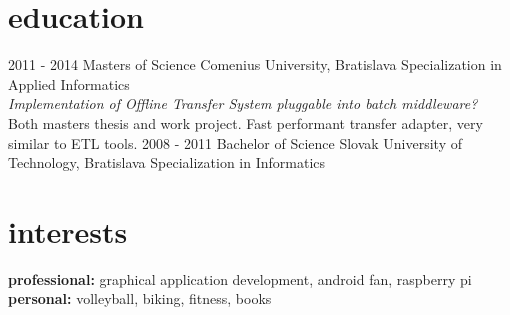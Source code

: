 \documentclass[]{friggeri-cv} %
\begin{document}

\section{education}

\begin{entrylist}
\entry
{2011 - 2014}
{Masters {\normalfont of Science}}
{Comenius University, Bratislava}
{Specialization in Applied Informatics\\
\emph{Implementation of Offline Transfer System pluggable into batch middleware?}\\ 
Both masters thesis and work project. Fast performant transfer adapter, very similar to ETL tools.}
\entry
{2008 - 2011}
{Bachelor {\normalfont of Science}}
{Slovak University of Technology, Bratislava}
{Specialization in Informatics}
\end{entrylist}



\section{interests}

\textbf{professional:} graphical application development, android fan, raspberry pi 
\textbf{personal:} volleyball, biking, fitness, books

\end{document}
